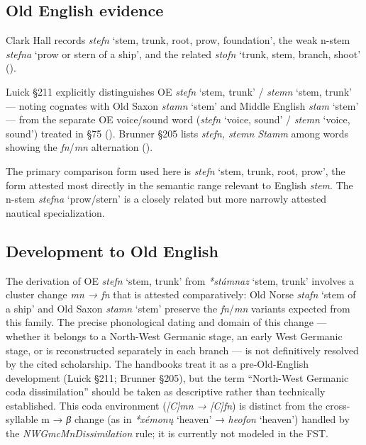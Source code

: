 \documentclass[
  british,
  a4paper,
  openany]{book}
\providecommand{\Recon}[1]{\emph{*#1}}
{\catcode`→=\active \global\def→{\ensuremath{\rightarrow}}}
\providecommand{\Recon}[1]{\emph{*#1}}
{\catcode`→=\active \global\def→{\ensuremath{\rightarrow}}}
\begin{document}
\subsection{Old English evidence}\label{old-english-evidence-139}

Clark Hall records {\emph{stefn}} `stem, trunk, root, prow, foundation',
the weak n-stem {\emph{stefna}} `prow or stern of a ship', and the
related {\emph{stofn}} `trunk, stem, branch, shoot'
().

Luick §211 explicitly distinguishes OE \emph{stefn} `stem, trunk' /
\emph{stemn} `stem, trunk' --- noting cognates with Old Saxon
{\emph{stamn}} `stem' and Middle English {\emph{stam}} `stem' --- from
the separate OE voice/sound word (\emph{stefn} `voice, sound' /
\emph{stemn} `voice, sound') treated in §75
(). Brunner §205
lists \emph{stefn, stemn Stamm} among words showing the
\emph{fn}/\emph{mn} alternation
().

The primary comparison form used here is {\emph{stefn}} `stem, trunk,
root, prow', the form attested most directly in the semantic range
relevant to English \emph{stem}. The n-stem {\emph{stefna}} `prow/stern'
is a closely related but more narrowly attested nautical specialization.

\subsection{Development to Old
English}\label{development-to-old-english-139}

The derivation of OE {\emph{stefn}} `stem, trunk' from \Recon{stámnaz}
`stem, trunk' involves a cluster change \emph{mn → fn} that is attested
comparatively: Old Norse {\emph{stafn}} `stem of a ship' and Old Saxon
{\emph{stamn}} `stem' preserve the \emph{fn}/\emph{mn} variants expected
from this family. The precise phonological dating and domain of this
change --- whether it belongs to a North-West Germanic stage, an early
West Germanic stage, or is reconstructed separately in each branch ---
is not definitively resolved by the cited scholarship. The handbooks
treat it as a pre-Old-English development (Luick §211; Brunner §205),
but the term ``North-West Germanic coda dissimilation'' should be taken
as descriptive rather than technically established. This coda
environment (\emph{{[}C{]}mn → {[}C{]}fn}) is distinct from the
cross-syllable m → \emph{β} change (as in \Recon{xémonų} `heaven' →
{\emph{heofon}} `heaven') handled by the \emph{NWGmcMnDissimilation}
rule; it is currently not modeled in the FST.
\end{document}
